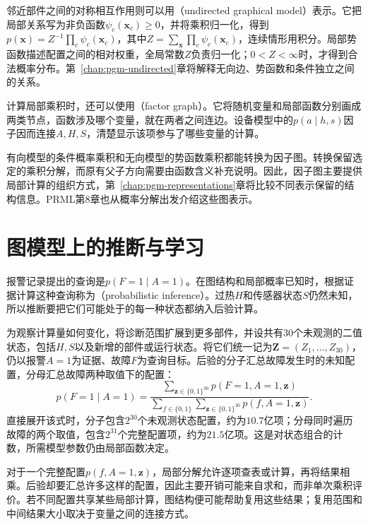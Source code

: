 邻近部件之间的对称相互作用则可以用（undirected graphical model）表示。它把局部关系写为非负函数$\psi_c(\bm x_c)\geq0$，并将乘积归一化，得到$p(\bm x)=Z^{-1}\prod_c\psi_c(\bm x_c)$，其中$Z=\sum_{\bm x}\prod_c\psi_c(\bm x_c)$，连续情形用积分。局部势函数描述配置之间的相对权重，全局常数$Z$负责归一化；$0<Z<\infty$时，才得到合法概率分布。第~\ref{chap:pgm-undirected}章将解释无向边、势函数和条件独立之间的关系。

计算局部乘积时，还可以使用（factor graph）。它将随机变量和局部函数分别画成两类节点，函数涉及哪个变量，就在两者之间连边。设备模型中的$p(a\mid h,s)$因子因而连接$A,H,S$，清楚显示该项参与了哪些变量的计算。

有向模型的条件概率乘积和无向模型的势函数乘积都能转换为因子图。转换保留选定的乘积分解，而原有父子方向需要由函数含义补充说明。因此，因子图主要提供局部计算的组织方式，第~\ref{chap:pgm-representations}章将比较不同表示保留的结构信息。PRML第8章也从概率分解出发介绍这些图表示。

\section{图模型上的推断与学习}
\label{sec:pgm-overview-inference-learning}

报警记录提出的查询是$p(F=1\mid A=1)$。在图结构和局部概率已知时，根据证据计算这种查询称为（probabilistic inference）。过热$H$和传感器状态$S$仍然未知，所以推断要把它们可能处于的每一种状态都纳入后验计算。

为观察计算量如何变化，将诊断范围扩展到更多部件，并设共有$30$个未观测的二值状态，包括$H,S$以及新增的部件或运行状态。将它们统一记为$\bm{Z}=(Z_1,\ldots,Z_{30})$，仍以报警$A=1$为证据、故障$F$为查询目标。后验的分子汇总故障发生时的未知配置，分母汇总故障两种取值下的配置：
\begin{equation}
  p(F=1\mid A=1)
  =
  \frac{
    \displaystyle\sum_{\bm{z}\in\{0,1\}^{30}}
    p(F=1,A=1,\bm{z})
  }{
    \displaystyle\sum_{f\in\{0,1\}}
    \sum_{\bm{z}\in\{0,1\}^{30}}
    p(f,A=1,\bm{z})
  }.
  \label{eq:pgm-overview-expanded-diagnosis}
\end{equation}
直接展开该式时，分子包含$2^{30}$个未观测状态配置，约为$10.7$亿项；分母同时遍历故障的两个取值，包含$2^{31}$个完整配置项，约为$21.5$亿项。这是对状态组合的计数，所需模型参数仍由局部函数决定。

对于一个完整配置$p(f,A=1,\bm{z})$，局部分解允许逐项查表或计算，再将结果相乘。后验却要汇总许多这样的配置，因此主要开销可能来自求和，而非单次乘积评价。若不同配置共享某些局部计算，图结构便可能帮助复用这些结果；复用范围和中间结果大小取决于变量之间的连接方式。

